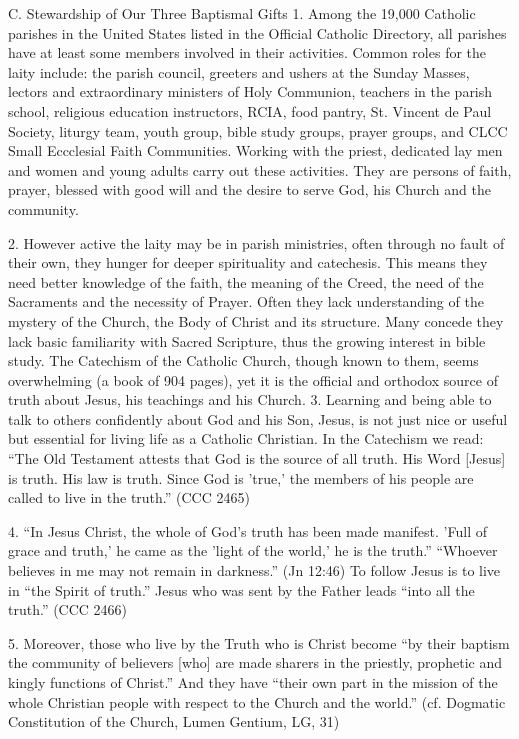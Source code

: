 \documentclass[oneside]{book}
\begin{document}
C. Stewardship of Our Three Baptismal Gifts
1. Among the 19,000 Catholic parishes in the United States listed in the
Official Catholic Directory, all parishes have at least some members involved in
their activities. Common roles for the laity include: the parish council,
greeters and ushers at the Sunday Masses, lectors and extraordinary ministers of
Holy Communion, teachers in the parish school, religious education instructors,
RCIA, food pantry, St. Vincent de Paul Society, liturgy team, youth group, bible
study groups, prayer groups, and CLCC Small Eccclesial Faith
Communities. Working with the priest, dedicated lay men and women and young
adults carry out these activities. They are persons of faith, prayer, blessed
with good will and the desire to serve God, his Church and the community.

2. However active the laity may be in parish ministries, often through no fault
of their own, they hunger for deeper spirituality and catechesis. This means
they need better knowledge of the faith, the meaning of the Creed, the need of
the Sacraments and the necessity of Prayer. Often they lack understanding of the
mystery of the Church, the Body of Christ and its structure. Many concede they
lack basic familiarity with Sacred Scripture, thus the growing interest in bible
study. The Catechism of the Catholic Church, though known to them, seems
overwhelming (a book of 904 pages), yet it is the official and orthodox source
of truth about Jesus, his teachings and his Church.
3. Learning and being able to talk to others confidently about God and his Son,
Jesus, is not just nice or useful but essential for living life as a Catholic
Christian. In the Catechism we read: ``The Old Testament attests that God is the
source of all truth. His Word [Jesus] is truth. His law is truth. Since God is
'true,' the members of his people are called to live in the truth.'' (CCC 2465)

4. ``In Jesus Christ, the whole of God's truth has been made manifest. 'Full of
grace and truth,' he came as the 'light of the world,' he is the truth.''
``Whoever believes in me may not remain in darkness.'' (Jn 12:46) To follow
Jesus is to live in ``the Spirit of truth.'' Jesus who was sent by the Father
leads ``into all the truth.'' (CCC 2466)

5. Moreover, those who live by the Truth who is Christ become ``by their baptism
the community of believers [who] are made sharers in the priestly, prophetic and
kingly functions of Christ.'' And they have ``their own part in the mission of
the whole Christian people with respect to the Church and the world.''
(cf. Dogmatic Constitution of the Church, Lumen Gentium, LG, 31)
\end{document}
